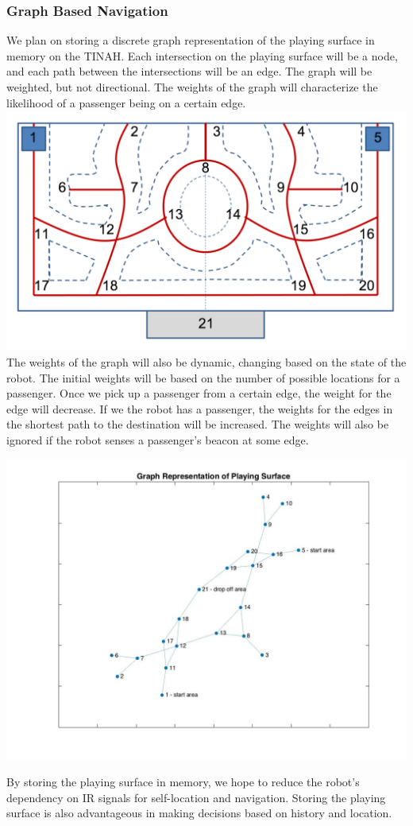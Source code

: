 \documentclass[12pt]{article}
\begin{document}
\subsubsection{Graph Based Navigation}
We plan on storing a discrete graph representation of the playing surface in
memory on the TINAH.  Each intersection on the playing surface will be a node,
and each path between the intersections will be an edge.  The graph will be
weighted, but not directional.  The weights of the graph will characterize the
likelihood of a passenger being on a certain edge.\\
\includegraphics[scale = 0.5]{map}
\newline
The weights of the graph will also be dynamic, changing based on the state of
the robot.  The initial weights will be based on the number of possible
locations for a passenger.  Once we pick up a passenger from a certain edge, the
weight for the edge will decrease.  If we the robot has a passenger, the weights
for the edges in the shortest path to the destination will be increased.  The
weights will also be ignored if the robot senses a passenger’s beacon at some
edge.\\
\begin{center}
\includegraphics[scale = 0.4]{graph}
\newline
\end{center}
By storing the playing surface in memory, we hope to reduce the robot’s
dependency on IR signals for self-location and navigation.  Storing the playing
surface is also advantageous in making decisions based on history and location.
\end{document}
